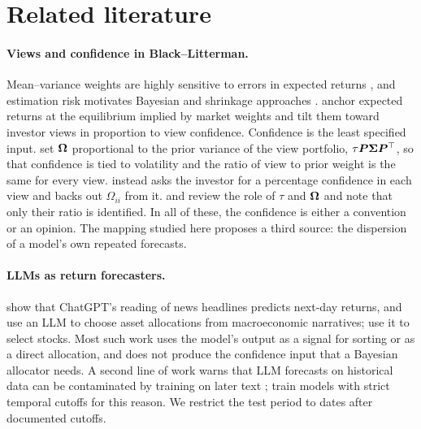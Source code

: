 \section{Related literature}\label{sec:related}

\paragraph{Views and confidence in Black--Litterman.}
Mean--variance weights are highly sensitive to errors in expected returns \citep{best1991sensitivity,chopra1993effect,michaud1989markowitz}, and estimation risk motivates Bayesian and shrinkage approaches \citep{jorion1986bayes,pastor2000portfolio,garlappi2007portfolio,demiguel2009optimal}. \citet{black1992global} anchor expected returns at the equilibrium implied by market weights and tilt them toward investor views in proportion to view confidence. Confidence is the least specified input. \citet{he2002intuition} set $\bm{\Omega}$ proportional to the prior variance of the view portfolio, $\tau\bm{P}\bm{\Sigma}\bm{P}^\top$, so that confidence is tied to volatility and the ratio of view to prior weight is the same for every view. \citet{idzorek2007step} instead asks the investor for a percentage confidence in each view and backs out $\Omega_{ii}$ from it. \citet{satchell2007demystification} and \citet{walters2014black} review the role of $\tau$ and $\bm{\Omega}$ and note that only their ratio is identified. In all of these, the confidence is either a convention or an opinion. The mapping studied here proposes a third source: the dispersion of a model's own repeated forecasts.

\paragraph{LLMs as return forecasters.}
\citet{lopez2023can} show that ChatGPT's reading of news headlines predicts next-day returns, and \citet{kim2023if} use an LLM to choose asset allocations from macroeconomic narratives; \citet{romanko2023chatgpt} use it to select stocks. Most such work uses the model's output as a signal for sorting or as a direct allocation, and does not produce the confidence input that a Bayesian allocator needs. A second line of work warns that LLM forecasts on historical data can be contaminated by training on later text \citep{glasserman2023assessing,sarkar2024lookahead}; \citet{drinkall2024time} train models with strict temporal cutoffs for this reason. We restrict the test period to dates after documented cutoffs.

